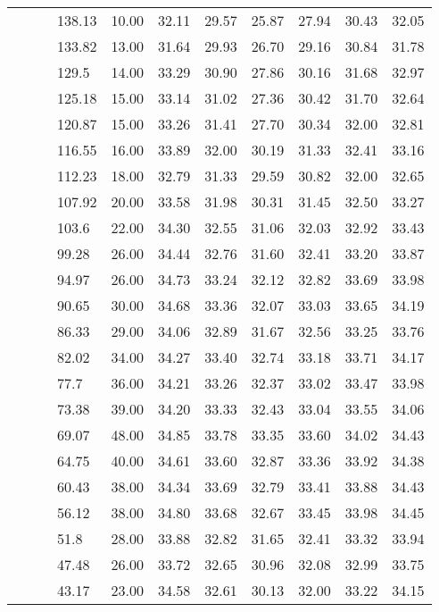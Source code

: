 \begin{longtable}{llllrrrrrrr}
   &  &  & 138.13 & 10.00 & 32.11 & 29.57 & 25.87 & 27.94 & 30.43 & 32.05 \\ 
   &  &  & 133.82 & 13.00 & 31.64 & 29.93 & 26.70 & 29.16 & 30.84 & 31.78 \\ 
   &  &  & 129.5 & 14.00 & 33.29 & 30.90 & 27.86 & 30.16 & 31.68 & 32.97 \\ 
   &  &  & 125.18 & 15.00 & 33.14 & 31.02 & 27.36 & 30.42 & 31.70 & 32.64 \\ 
   &  &  & 120.87 & 15.00 & 33.26 & 31.41 & 27.70 & 30.34 & 32.00 & 32.81 \\ 
   &  &  & 116.55 & 16.00 & 33.89 & 32.00 & 30.19 & 31.33 & 32.41 & 33.16 \\ 
   &  &  & 112.23 & 18.00 & 32.79 & 31.33 & 29.59 & 30.82 & 32.00 & 32.65 \\ 
   &  &  & 107.92 & 20.00 & 33.58 & 31.98 & 30.31 & 31.45 & 32.50 & 33.27 \\ 
   &  &  & 103.6 & 22.00 & 34.30 & 32.55 & 31.06 & 32.03 & 32.92 & 33.43 \\ 
   &  &  & 99.28 & 26.00 & 34.44 & 32.76 & 31.60 & 32.41 & 33.20 & 33.87 \\ 
   &  &  & 94.97 & 26.00 & 34.73 & 33.24 & 32.12 & 32.82 & 33.69 & 33.98 \\ 
   &  &  & 90.65 & 30.00 & 34.68 & 33.36 & 32.07 & 33.03 & 33.65 & 34.19 \\ 
   &  &  & 86.33 & 29.00 & 34.06 & 32.89 & 31.67 & 32.56 & 33.25 & 33.76 \\ 
   &  &  & 82.02 & 34.00 & 34.27 & 33.40 & 32.74 & 33.18 & 33.71 & 34.17 \\ 
   &  &  & 77.7 & 36.00 & 34.21 & 33.26 & 32.37 & 33.02 & 33.47 & 33.98 \\ 
   &  &  & 73.38 & 39.00 & 34.20 & 33.33 & 32.43 & 33.04 & 33.55 & 34.06 \\ 
   &  &  & 69.07 & 48.00 & 34.85 & 33.78 & 33.35 & 33.60 & 34.02 & 34.43 \\ 
   &  &  & 64.75 & 40.00 & 34.61 & 33.60 & 32.87 & 33.36 & 33.92 & 34.38 \\ 
   &  &  & 60.43 & 38.00 & 34.34 & 33.69 & 32.79 & 33.41 & 33.88 & 34.43 \\ 
   &  &  & 56.12 & 38.00 & 34.80 & 33.68 & 32.67 & 33.45 & 33.98 & 34.45 \\ 
   &  &  & 51.8 & 28.00 & 33.88 & 32.82 & 31.65 & 32.41 & 33.32 & 33.94 \\ 
   &  &  & 47.48 & 26.00 & 33.72 & 32.65 & 30.96 & 32.08 & 32.99 & 33.75 \\ 
   &  &  & 43.17 & 23.00 & 34.58 & 32.61 & 30.13 & 32.00 & 33.22 & 34.15 \\ 

\end{longtable}
